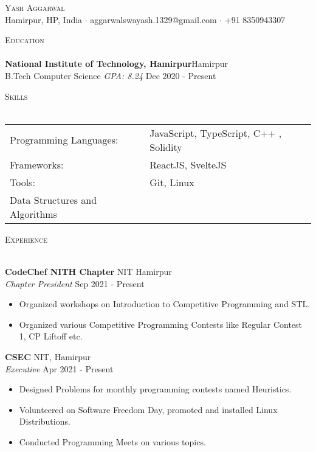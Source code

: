 \documentclass[a4paper]{article}
\newcommand{\lineunder} {
    \vspace*{-8pt} \\
    \hspace*{-18pt} \hrulefill \\
}
\newcommand{\header} [1] {
    {\hspace*{-18pt}\vspace*{6pt} \textsc{#1}}
    \vspace*{-6pt} \lineunder
}
\begin{document}
\vspace*{-40pt}



\vspace*{-10pt}
\begin{center}
	{\Huge \scshape {Yash Aggarwal}}\\
	Hamirpur, HP, India $\cdot$ aggarwalswayash.1329@gmail.com $\cdot$ +91 8350943307\\
\end{center}

\header{Education}
\textbf{National Institute of Technology, Hamirpur}\hfill Hamirpur\\
B.Tech Computer Science \textit{GPA: 8.24} \hfill Dec 2020 - Present\\
\vspace{2mm}

\header{Skills}
\begin{tabular}{ l l }
	Programming Languages:          & JavaScript, TypeScript, C++ , Solidity        \\
	Frameworks:                     & ReactJS, SvelteJS          \\
	Tools:                          & Git, Linux  \\
	Data Structures and Algorithms &                                           \\
\end{tabular}
\vspace{2mm}

\header{Experience}
\vspace{1mm}

\textbf{CodeChef NITH Chapter} \hfill NIT Hamirpur\\
\textit{Chapter President} \hfill Sep 2021 - Present\\
\vspace{-1mm}
\begin{itemize} \itemsep 1pt
	\item Organized workshops on Introduction to Competitive Programming and STL.
	\item Organized various Competitive Programming Contests like Regular Contest 1, CP Liftoff etc.
\end{itemize}
\textbf{CSEC} \hfill NIT, Hamirpur\\
\textit{Executive} \hfill Apr 2021 - Present\\
\vspace{-1mm}
\begin{itemize} \itemsep 1pt
	\item Designed Problems for monthly programming contests named Heuristics.
	\item Volunteered on Software Freedom Day, promoted and installed Linux Distributions.
	\item Conducted Programming Meets on various topics.
\end{itemize}
\end{document}
